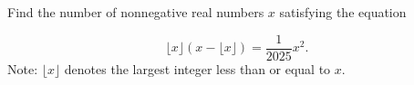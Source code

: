 Find the number of nonnegative real numbers $x$ satisfying the equation

$$\lfloor x\rfloor (x-\lfloor x\rfloor)=\dfrac{1}{2025}x^2.$$Note: $\lfloor x\rfloor$ denotes the largest integer less than or equal to $x$.
